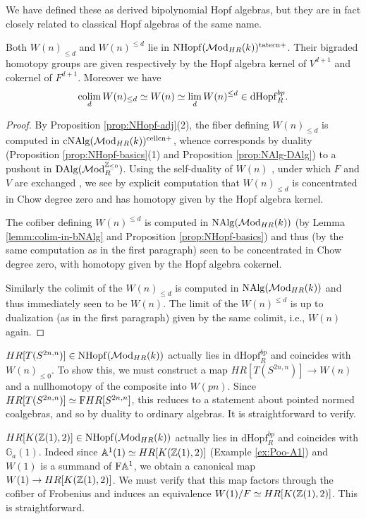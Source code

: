 \documentclass{amsart}
\renewcommand{\NB}[1]{}
\numberwithin{proposition}{section}
\numberwithin{equation}{section}
\def\cell{\mathrm{cell}}
\def\tate{\mathrm{tate}}
\def\NHopf{\mathrm{NHopf}}
\def\dHopf{\mathrm{dHopf}}
\def\cNAlg{\mathrm{cNAlg}}
\def\cn{\mathrm{cn}}
\def\DAlg{\mathrm{DAlg}}
\newcommand{\Ga}{{\mathbb{G}_a}}
\def\Free{\mathrm{F}}
\begin{document}
We have defined these as derived bipolynomial Hopf algebras, but they are in fact closely related to classical Hopf algebras of the same name.
\begin{lemma} \label{lemm:Witt-filtrations}
Both $W(n)_{\le d}$ and $W(n)^{\le d}$ lie in $\NHopf(\Mod_{HR}(k))^{\tate\cn+}$.
Their bigraded homotopy groups are given respectively by the Hopf algebra kernel of $V^{d+1}$ and cokernel of $F^{d+1}$.
Moreover we have \[ \colim_d W(n)_{\le d} \wequi W(n) \wequi \lim_d W(n)^{\le d} \in \dHopf_R^{bp}. \]
\end{lemma}
\begin{proof}
By Proposition \ref{prop:NHopf-adj}(2), the fiber defining $W(n)_{\le d}$ is computed in $\cNAlg(\Mod_{HR}(k))^{\cell\cn+}$, whence corresponds by duality (Proposition \ref{prop:NHopf-basics}(1) and Proposition \ref{prop:NAlg-DAlg}) to a pushout in $\DAlg(\Mod_R^{\Z_{\le 0}})$.
Using the self-duality of $W(n)$ \cite[Propositions~(7.2) and~(8.3)]{husemoller-hopf}, under which $F$ and $V$ are exchanged \cite[Theorem~13.48, equation~(13.56)]{hazewinkel-witt-vectors}, we see by explicit computation that $W(n)_{\le d}$ is concentrated in Chow degree zero and has homotopy given by the Hopf algebra kernel.\NB{details?}

The cofiber defining $W(n)^{\le d}$ is computed in $\mathrm{NAlg}(\mathcal{M}\mathrm{od}_{HR}(k))$ (by Lemma \ref{lemm:colim-in-bNAlg} and Proposition \ref{prop:NHopf-basics}) and thus (by the same computation as in the first paragraph) seen to be concentrated in Chow degree zero, with homotopy given by the Hopf algebra cokernel.

Similarly the colimit of the $W(n)_{\le d}$ is computed in $\mathrm{NAlg}(\mathcal{M}\mathrm{od}_{HR}(k))$ and thus immediately seen to be $W(n)$.
The limit of the $W(n)^{\le d}$ is up to dualization (as in the first paragraph) given by the same colimit, i.e., $W(n)$ again.
\end{proof}

\begin{example} \label{ex:sphere-bipolynomial}
$HR[T(S^{2n,n})] \in \NHopf(\Mod_{HR}(k))$ actually lies in $\dHopf_R^{bp}$ and coincides with $W(n)_{\le 0}$.
To show this, we must construct a map $HR[T(S^{2n,n})] \to W(n)$ and a nullhomotopy of the composite into $W(pn)$.
Since $HR[T(S^{2n,n})] \wequi \Free HR[S^{2n,n}]$, this reduces to a statement about pointed normed coalgebras, and so by duality to ordinary algebras.
It is straightforward to verify.
\end{example}

\begin{example} \label{ex:Poo-bipolynomial}
$HR[K(\Z(1),2)] \in \NHopf(\Mod_{HR}(k))$ actually lies in $\dHopf_R^{bp}$ and coincides with $\Ga(1)$.
Indeed since $\mathbb A^1(1) \simeq HR[K(\mathbb{Z}(1),2)]$ (Example \ref{ex:Poo-A1}) and $W(1)$ is a summand of $\Free\A^1$, we obtain a canonical map $W(1) \to HR[K(\mathbb{Z}(1),2)]$.
We must verify that this map factors through the cofiber of Frobenius and induces an equivalence $W(1)/F \simeq HR[K(\mathbb{Z}(1),2)]$.
This is straightforward.\NB{details?}
\end{example}
\end{document}
